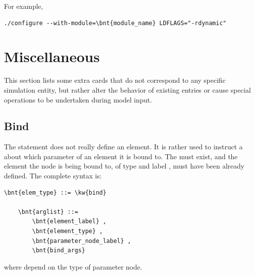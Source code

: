 \bigskip

\noindent
{}

\bigskip

For example,
\begin{Verbatim}[commandchars=\\\{\}]
    ./configure --with-module=\bnt{module_name} LDFLAGS="-rdynamic" 
\end{Verbatim}




\section{Miscellaneous}
This section lists some extra cards that do not correspond to any
specific simulation entity, but rather alter the behavior 
of existing entries or cause special operations to be undertaken
during model input.



\subsection{Bind}\label{sec:EL:MISC:BIND}
The statement  does not really define an element.
It is rather used to instruct a
about which parameter of an element it is bound to.
The  must exist, and the element the node 
is being bound to, of type  and label ,
must have been already defined.
The complete syntax is:
\begin{Verbatim}[commandchars=\\\{\}]
    \bnt{elem_type} ::= \kw{bind}

    \bnt{arglist} ::=
        \bnt{element_label} ,
        \bnt{element_type} ,
        \bnt{parameter_node_label} , 
        \bnt{bind_args}
\end{Verbatim}
where  depend on the type of parameter node.


